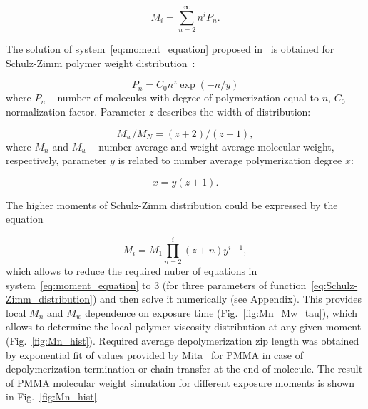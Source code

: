\begin{equation}
	M_i=\sum_{n=2}^{\infty} n^i P_n.
\end{equation}

The solution of system~\ref{eq:moment_equation} proposed in~\cite{Boyd_3} is obtained for Schulz-Zimm polymer weight distribution~\cite{Schulz-Zimm_distribution}:

\begin{equation} \label{eq:Schulz-Zimm_distribution}
	P_n = C_0 n^z \exp (-n/y)
\end{equation}
where $P_n$ -- number of molecules with degree of polymerization equal to $n$, $C_0$ -- normalization factor. Parameter $z$ describes the width of distribution:

\begin{equation} \label{eq:Schulz-Zimm_1}
	M_w / M_N=(z+2) /(z+1),
\end{equation}
where $M_n$ and $M_w$ -- number average and weight average molecular weight, respectively, parameter $y$ is related to number average polymerization degree $x$:

\begin{equation} \label{eq:Schulz-Zimm_2}
	x=y(z+1).
\end{equation}

The higher moments of Schulz-Zimm distribution could be expressed by the equation

\begin{equation}
	M_i=M_1 \prod_{n=2}^i(z+n) y^{i-1},
\end{equation}
which allows to reduce the required nuber of equations in system~\ref{eq:moment_equation} to 3 (for three parameters of function~\ref{eq:Schulz-Zimm_distribution}) and then solve it numerically (see Appendix). This provides local $M_n$ and $M_w$ dependence on exposure time (Fig.~\ref{fig:Mn_Mw_tau}), which allows to determine the local polymer viscosity distribution at any given moment (Fig.~\ref{fig:Mn_hist}). Required average depolymerization zip length was obtained by exponential fit of values provided by Mita~\cite{Mita_PMMA_zip_lengths_T} for PMMA in case of depolymerization termination or chain transfer at the end of molecule. The result of PMMA molecular weight simulation for different exposure moments is shown in Fig.~\ref{fig:Mn_hist}.



